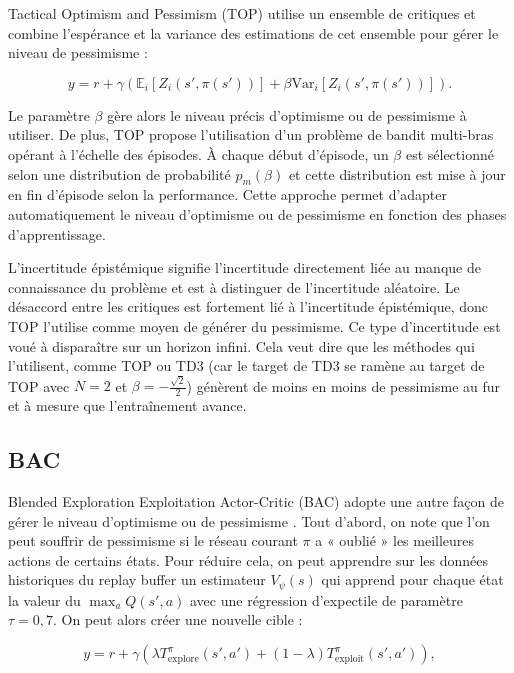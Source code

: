 \documentclass[a4paper, 12pt]{report}
\begin{document}
    Tactical Optimism and Pessimism (TOP) utilise un ensemble de critiques et
    combine l'espérance et la variance des estimations de cet ensemble pour
    gérer le niveau de pessimisme
    \cite{moskovitz2022tacticaloptimismpessimismdeep} :

    $$
    y = r + \gamma (\mathbb{E}_i [ Z_i(s', \pi(s')) ] + \beta \text{Var}_i [ Z_i(s' ,\pi(s')) ]).
    $$

    Le paramètre $\beta$ gère alors le niveau précis d'optimisme ou de
    pessimisme à utiliser. De plus, TOP propose l'utilisation d'un problème de
    bandit multi-bras opérant à l'échelle des épisodes. À chaque début
    d'épisode, un $\beta$ est sélectionné selon une distribution de probabilité
    $p_m (\beta)$ et cette distribution est mise à jour en fin d'épisode selon
    la performance. Cette approche permet d'adapter automatiquement le niveau
    d'optimisme ou de pessimisme en fonction des phases d'apprentissage.

    L'incertitude épistémique signifie l'incertitude directement liée au manque
    de connaissance du problème et est à distinguer de l'incertitude aléatoire.
    Le désaccord entre les critiques est fortement lié à l'incertitude
    épistémique, donc TOP l'utilise comme moyen de générer du pessimisme. Ce
    type d'incertitude est voué à disparaître sur un horizon infini. Cela veut
    dire que les méthodes qui l'utilisent, comme TOP ou TD3 (car le target de
    TD3 se ramène au target de TOP avec $N=2$ et $\beta = -\frac{\sqrt{2}}{2}$)
    génèrent de moins en moins de pessimisme au fur et à mesure que
    l'entraînement avance.

    \subsection{BAC}

    Blended Exploration Exploitation Actor-Critic (BAC) adopte une autre façon
    de gérer le niveau d'optimisme ou de pessimisme
    \cite{ji2024seizingserendipityexploitingvalue}. Tout d'abord, on note que
    l'on peut souffrir de pessimisme si le réseau courant $\pi$ a « oublié »
    les meilleures actions de certains états. Pour réduire cela, on peut
    apprendre sur les données historiques du replay buffer un estimateur
    $V_\psi(s)$ qui apprend pour chaque état la valeur du $\max_a Q(s', a)$
    avec une régression d'expectile de paramètre $\tau = 0,7$. On peut alors
    créer une nouvelle cible :

    $$
    y = r + \gamma (\lambda T^\pi_{\text{explore}} (s', a') + (1 - \lambda) T^\pi_{\text{exploit}} (s', a')),
    $$
\end{document}

